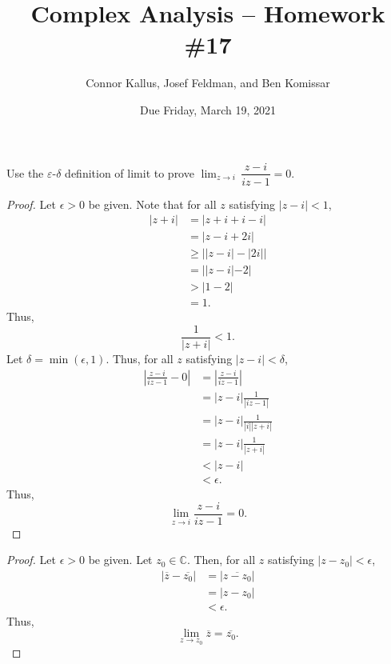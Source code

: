 \documentclass[11pt]{article}       %
\title{Complex Analysis -- Homework \#17}
\author{Connor Kallus, Josef Feldman, and Ben Komissar}
\date{Due Friday, March 19, 2021}
\theoremstyle{definition}
\begin{document}
\color{white}
\pagecolor{black}
\maketitle

  Use the $\varepsilon$-$\delta$ definition of limit to prove $\displaystyle \lim_{z \to i} \, \dfrac{z-i}{iz-1}= 0$.
\begin{proof}
    Let $\epsilon > 0$ be given.
    Note that for all $z$ satisfying $|z-i|<1$,
    \begin{align*}
        |z+i| &= |z+i+i-i| \\
              &= |z-i + 2i| \\
              &\geq \left||z-i| - |2i|\right| \\
              &= ||z-i|-2| \\
              &> |1-2| \\
              &= 1.
    \end{align*}
    Thus, $$\frac1{|z+i|} < 1.$$
    Let $\delta = \min(\epsilon, 1)$.
    Thus, for all $z$ satisfying $|z-i| < \delta$,
    \begin{align*}
        \left|\frac{z-i}{iz-1} - 0\right| &= \left|\frac{z-i}{iz-1}\right| \\
                                          &= |z-i| \frac{1}{|iz-1|} \\
                                          &= |z-i| \frac{1}{|i||z+i|} \\
                                          &= |z-i| \frac{1}{|z+i|} \\
                                          &< |z-i| \\
                                          &< \epsilon.
    \end{align*}
    Thus, $$\lim_{z \to i} \frac{z-i}{iz-1} = 0.$$
\end{proof}

\newpage
{}
\begin{proof}
    Let $\epsilon > 0$ be given.
    Let $z_0 \in \mathbb C$.
    Then, for all $z$ satisfying $|z-z_0| < \epsilon$,
    \begin{align*}
        |\overline z - \overline {z_0}| &= |\overline{z-z_0}| \\
                                        &= |z-z_0| \\
                                        &< \epsilon.
    \end{align*}
    Thus, $$\lim_{z \to z_0} \overline z = \overline {z_0}.$$
\end{proof}
\end{document}

